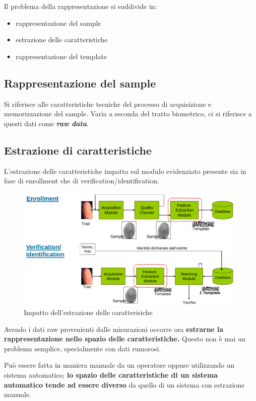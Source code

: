 Il problema della rappresentazione si suddivide in:
\begin{itemize}
    \item rappresentazione del sample
    \item estrazione delle caratteristiche
    \item rappresentazione del template
\end{itemize}

\subsection{Rappresentazione del sample}

Si riferisce alle caratteristiche tecniche del processo di acquisizione e memorizzazione del sample.
Varia a seconda del tratto biometrico, ci si riferisce a questi dati come \textbf{\textit{raw data}}.

\subsection{Estrazione di caratteristiche}

L'estrazione delle caratteristiche impatta sul modulo evidenziato
presente sia in fase di enrollment che di verification/identification.

\begin{figure}[ht]
    \centering
    \includegraphics[width=1\linewidth]{chapters/images-chap2/estrazione.png}
    \caption{Impatto dell'estrazione delle caratterisiche}
\end{figure}

Avendo i dati raw provenienti dalle misurazioni occorre ora \textbf{estrarne la rappresentazione nello spazio delle caratteristiche.}
Questo non è mai un problema semplice, specialmente con dati rumorosi.

Può essere fatta in maniera manuale da un operatore oppure utilizzando un sistema automatico; \textbf{lo spazio delle 
caratteristiche di un sistema automatico tende ad essere diverso} da quello di un sistema con estrazione manuale.

